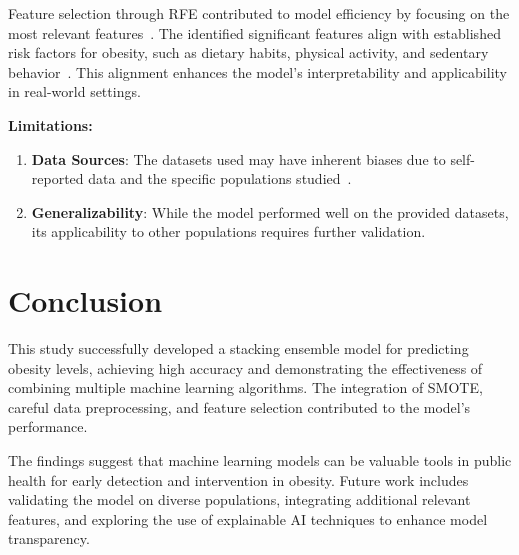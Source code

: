 \documentclass[12pt, a4paper]{article}
\begin{document}
Feature selection through RFE contributed to model efficiency by focusing on the most
relevant features~\cite{kohavi1997}. The identified significant features align with
established risk factors for obesity, such as dietary habits, physical activity, and
sedentary behavior~\cite{tzioumis2014,lobstein2015}. This alignment enhances the
model's interpretability and applicability in real-world settings.

\textbf{Limitations:}
\begin{enumerate}[label=\textbf{\alph*.}]
  \item \textbf{Data Sources}: The datasets used may have inherent biases due to
        self-reported data and the specific populations studied~\cite{cervantes2020,cdc2023}.
  \item \textbf{Generalizability}: While the model performed well on the provided
        datasets, its applicability to other populations requires further validation.
\end{enumerate}

\section{Conclusion}

This study successfully developed a stacking ensemble model for predicting obesity
levels, achieving high accuracy and demonstrating the effectiveness of combining
multiple machine learning algorithms. The integration of SMOTE, careful data
preprocessing, and feature selection contributed to the model's performance.

The findings suggest that machine learning models can be valuable tools in public health
for early detection and intervention in obesity. Future work includes validating the
model on diverse populations, integrating additional relevant features, and exploring
the use of explainable AI techniques to enhance model transparency.
\end{document}
